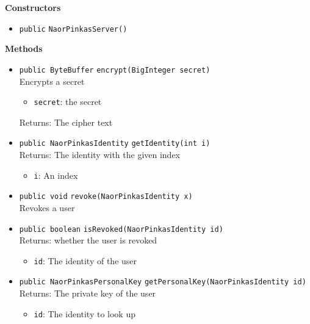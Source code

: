 \textbf{Constructors}
\begin{itemize}
\item \lstinline|public| \lstinline|NaorPinkasServer|\lstinline|()|




\end{itemize}


\textbf{Methods}
\begin{itemize}
\item \lstinline|public ByteBuffer| \lstinline|encrypt|\lstinline|(BigInteger secret)|\\
Encrypts a secret
\begin{itemize}
\item \lstinline|secret|: the secret
\end{itemize}

Returns: The cipher text

\item \lstinline|public NaorPinkasIdentity| \lstinline|getIdentity|\lstinline|(int i)|\\
Returns: The identity with the given index
\begin{itemize}
\item \lstinline|i|: An index
\end{itemize}



\item \lstinline|public void| \lstinline|revoke|\lstinline|(NaorPinkasIdentity x)|\\
Revokes a user



\item \lstinline|public boolean| \lstinline|isRevoked|\lstinline|(NaorPinkasIdentity id)|\\
Returns: whether the user is revoked
\begin{itemize}
\item \lstinline|id|: The identity of the user
\end{itemize}



\item \lstinline|public NaorPinkasPersonalKey| \lstinline|getPersonalKey|\lstinline|(NaorPinkasIdentity id)|\\
Returns: The private key of the user
\begin{itemize}
\item \lstinline|id|: The identity to look up
\end{itemize}



\end{itemize}

